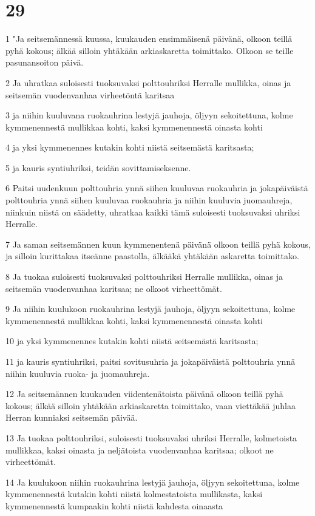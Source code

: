 \chapter{29}

\par 1 "Ja seitsemännessä kuussa, kuukauden ensimmäisenä päivänä, olkoon teillä pyhä kokous; älkää silloin yhtäkään arkiaskaretta toimittako. Olkoon se teille pasunansoiton päivä.
\par 2 Ja uhratkaa suloisesti tuoksuvaksi polttouhriksi Herralle mullikka, oinas ja seitsemän vuodenvanhaa virheetöntä karitsaa
\par 3 ja niihin kuuluvana ruokauhrina lestyjä jauhoja, öljyyn sekoitettuna, kolme kymmenennestä mullikkaa kohti, kaksi kymmenennestä oinasta kohti
\par 4 ja yksi kymmenennes kutakin kohti niistä seitsemästä karitsasta;
\par 5 ja kauris syntiuhriksi, teidän sovittamiseksenne.
\par 6 Paitsi uudenkuun polttouhria ynnä siihen kuuluvaa ruokauhria ja jokapäiväistä polttouhria ynnä siihen kuuluvaa ruokauhria ja niihin kuuluvia juomauhreja, niinkuin niistä on säädetty, uhratkaa kaikki tämä suloisesti tuoksuvaksi uhriksi Herralle.
\par 7 Ja saman seitsemännen kuun kymmenentenä päivänä olkoon teillä pyhä kokous, ja silloin kurittakaa itseänne paastolla, älkääkä yhtäkään askaretta toimittako.
\par 8 Ja tuokaa suloisesti tuoksuvaksi polttouhriksi Herralle mullikka, oinas ja seitsemän vuodenvanhaa karitsaa; ne olkoot virheettömät.
\par 9 Ja niihin kuulukoon ruokauhrina lestyjä jauhoja, öljyyn sekoitettuna, kolme kymmenennestä mullikkaa kohti, kaksi kymmenennestä oinasta kohti
\par 10 ja yksi kymmenennes kutakin kohti niistä seitsemästä karitsasta;
\par 11 ja kauris syntiuhriksi, paitsi sovitusuhria ja jokapäiväistä polttouhria ynnä niihin kuuluvia ruoka- ja juomauhreja.
\par 12 Ja seitsemännen kuukauden viidentenätoista päivänä olkoon teillä pyhä kokous; älkää silloin yhtäkään arkiaskaretta toimittako, vaan viettäkää juhlaa Herran kunniaksi seitsemän päivää.
\par 13 Ja tuokaa polttouhriksi, suloisesti tuoksuvaksi uhriksi Herralle, kolmetoista mullikkaa, kaksi oinasta ja neljätoista vuodenvanhaa karitsaa; olkoot ne virheettömät.
\par 14 Ja kuulukoon niihin ruokauhrina lestyjä jauhoja, öljyyn sekoitettuna, kolme kymmenennestä kutakin kohti niistä kolmestatoista mullikasta, kaksi kymmenennestä kumpaakin kohti niistä kahdesta oinaasta
